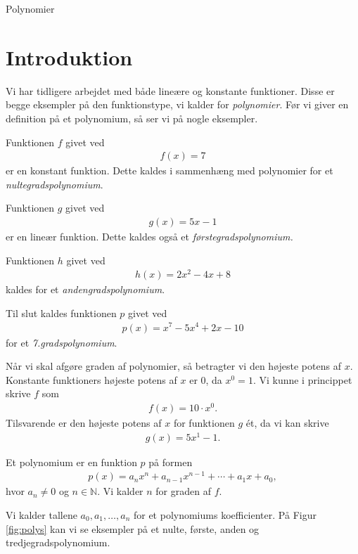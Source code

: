 
\begin{center}
\Huge
Polynomier
\end{center}
\section*{Introduktion}



Vi har tidligere arbejdet med både lineære og konstante funktioner. Disse er begge eksempler på den funktionstype, vi kalder for \textit{polynomier}. Før vi giver en definition på et polynomium, så ser vi på nogle eksempler.

\begin{exa}
	Funktionen $f$ givet ved
	\begin{align*}
		f(x) = 7
	\end{align*}
	er en konstant funktion. Dette kaldes i sammenhæng med polynomier for et \textit{nultegradspolynomium}.
	
	Funktionen $g$ givet ved
	\begin{align*}
		g(x) = 5x -1
	\end{align*}
	er en lineær funktion. Dette kaldes også et \textit{førstegradspolynomium.}
	
	Funktionen $h$ givet ved
	\begin{align*}
		h(x) = 2x^2 -4x + 8
	\end{align*}
	kaldes for et \textit{andengradspolynomium}.
	
	Til slut kaldes funktionen $p$ givet ved
	\begin{align*}
		p(x) = x^7 - 5x^4 + 2x - 10
	\end{align*}
	for et \textit{7.gradspolynomium}.
\end{exa}
Når vi skal afgøre graden af polynomier, så betragter vi den højeste potens af $x$. Konstante funktioners højeste potens af $x$ er 0, da $x^0 = 1$. Vi kunne i princippet skrive $f$ som
\begin{align*}
	f(x) = 10\cdot x^0.
\end{align*}
Tilsvarende er den højeste potens af $x$ for funktionen $g$ ét, da vi kan skrive
\begin{align*}
	g(x) = 5x^1 - 1.
\end{align*}

\begin{defn}
	Et polynomium er en funktion $p$ på formen
	\begin{align*}
		p(x) = a_nx^n+a_{n-1}x^{n-1}+\cdots+a_1 x + a_0,
	\end{align*}
	hvor $a_n \neq 0$ og $n\in \mathbb{N}$. Vi kalder $n$ for graden af $f$. 
\end{defn}
Vi kalder tallene $a_0,a_1,\hdots,a_n$ for et polynomiums koefficienter. På Figur \ref{fig:polys} kan vi se eksempler på et nulte, første, anden og tredjegradspolynomium.

